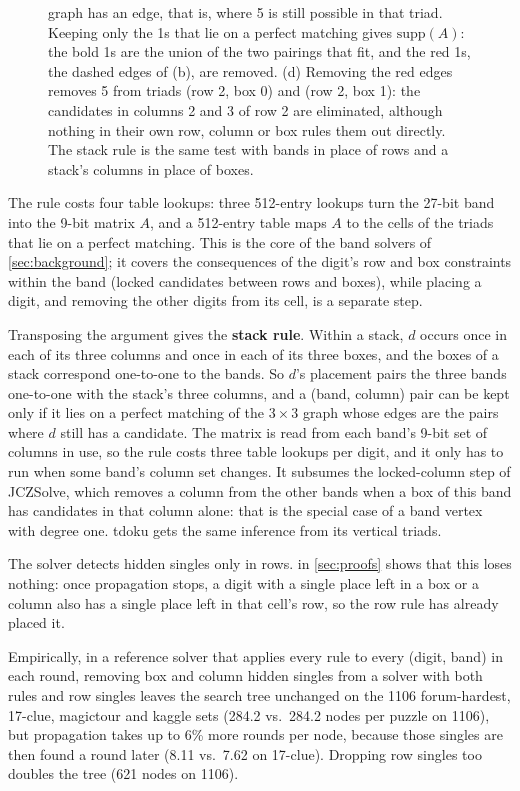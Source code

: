 \documentclass[11pt]{article}
\theoremstyle{definition}
\theoremstyle{plain}
\begin{document}
\begin{figure}[tbp]
{graph has an edge, that is, where 5 is still possible in that triad. Keeping only the 1s that lie on a perfect
matching gives $\mathrm{supp}(A)$: the bold 1s are the union of the two pairings that fit, and the red 1s, the dashed
edges of (b), are removed. (d) Removing the red edges removes 5 from triads (row 2, box 0) and (row 2, box 1): the
candidates in columns 2 and 3 of row 2 are eliminated, although nothing in their own row, column or box rules them
out directly. The stack rule is the same test with bands in place of rows and a stack's
columns in place of boxes.}
\label{fig:band}
\end{figure}

The rule costs four table lookups: three 512-entry lookups turn the 27-bit band into the 9-bit matrix $A$, and a
512-entry table maps $A$ to the cells of the triads that lie on a perfect matching. This is the core of the band
solvers of \cref{sec:background}; it covers the consequences of the digit's row and box constraints within the band (locked candidates between rows
and boxes), while placing a digit, and removing the other digits from its cell, is a separate step.

Transposing the argument gives the \textbf{stack rule}. Within a stack, $d$ occurs once in each of its three columns
and once in each of its three boxes, and the boxes of a stack correspond one-to-one to the bands. So $d$'s placement pairs the three bands one-to-one with the stack's three columns, and a (band,
column) pair can be kept only if it lies on a
perfect matching of the $3\times 3$ graph whose edges are the pairs where $d$ still has a candidate. The matrix is
read from each band's 9-bit set of columns in use, so the rule costs three table lookups per digit, and it only has
to run when some band's column set changes. It subsumes the locked-column step of JCZSolve, which removes a column
from the other bands when a box of this band has candidates in that column alone: that is the special case of a
band vertex with degree one. tdoku gets the same inference from its vertical triads.

The solver detects hidden singles only in rows.  in \cref{sec:proofs} shows that this loses
nothing: once propagation stops, a digit with a single place left in a box or a column also has a single place left
in that cell's row, so the row rule has already placed it.

Empirically, in a reference solver that applies every rule to every (digit, band) in each round, removing box and
column hidden singles from a solver with both rules and row singles leaves the search tree unchanged on the 1106
forum-hardest, 17-clue, magictour and kaggle sets (284.2 vs.\ 284.2 nodes per puzzle on 1106), but propagation takes
up to 6\% more rounds per node, because those singles are then found a round later (8.11 vs.\ 7.62 on 17-clue).
Dropping row singles too doubles the tree (621 nodes on 1106).
\end{document}
